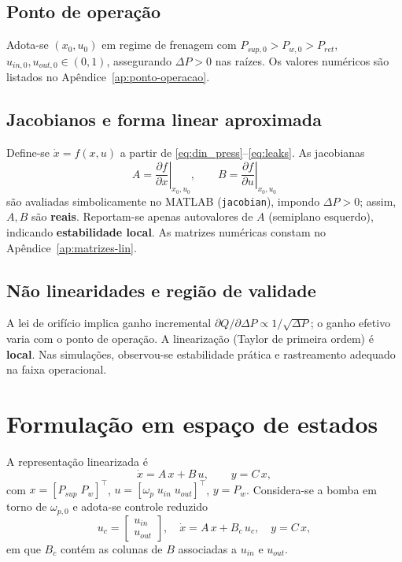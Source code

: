 \subsection{Ponto de operação}
\label{sec:definicao-ponto-operacao}

Adota-se $(x_0,u_0)$ em regime de frenagem com $P_{sup,0}>P_{w,0}>P_{ret}$, $u_{in,0},u_{out,0}\in(0,1)$, assegurando $\Delta P>0$ nas raízes. Os valores numéricos são listados no Apêndice~\ref{ap:ponto-operacao}.

\subsection{Jacobianos e forma linear aproximada}
\label{sec:derivacao-matrizes-jacobianas}

Define-se $\dot{x}=f(x,u)$ a partir de \eqref{eq:din_press}–\eqref{eq:leaks}. As jacobianas
\[
A=\left.\frac{\partial f}{\partial x}\right|_{x_0,u_0},\qquad
B=\left.\frac{\partial f}{\partial u}\right|_{x_0,u_0}
\]
são avaliadas simbolicamente no MATLAB (\texttt{jacobian}), impondo $\Delta P>0$; assim, $A,B$ são \textbf{reais}. Reportam-se apenas autovalores de $A$ (semiplano esquerdo), indicando \textbf{estabilidade local}. As matrizes numéricas constam no Apêndice~\ref{ap:matrizes-lin}.

\subsection{Não linearidades e região de validade}

A lei de orifício implica ganho incremental $\partial Q/\partial \Delta P \propto 1/\sqrt{\Delta P}$; o ganho efetivo varia com o ponto de operação. A linearização (Taylor de primeira ordem) é \textbf{local}. Nas simulações, observou-se estabilidade prática e rastreamento adequado na faixa operacional.

\section{Formulação em espaço de estados}
\label{sec:controle-formulacao-espaço-estados}

A representação linearizada é
\[
\dot{x}=A\,x+B\,u,\qquad y=C\,x,
\]
com $x=[P_{sup}\; P_w]^\top$, $u=[\omega_p\; u_{in}\; u_{out}]^\top$, $y=P_w$. Considera-se a bomba em torno de $\omega_{p,0}$ e adota-se controle reduzido
\[
u_c=\begin{bmatrix}u_{in}\\ u_{out}\end{bmatrix},\quad
\dot{x}=A\,x+B_c\,u_c,\quad y=C\,x,
\]
em que $B_c$ contém as colunas de $B$ associadas a $u_{in}$ e $u_{out}$.

